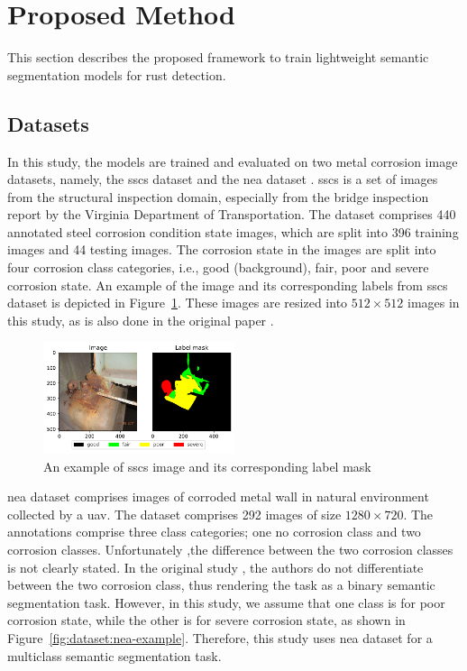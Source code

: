 \documentclass[mathematics,article,submit,pdftex,moreauthors]{Definitions/mdpi}
\begin{document}
\section{Proposed Method}
This section describes the proposed framework
to train lightweight semantic segmentation models
for rust detection. 

\subsection{Datasets}
In this study, the models are trained and evaluated on two metal corrosion image
datasets, namely, the \ac{sscs} dataset \cite{Bianchi2021Dataset,Bianchi2022Journal} and 
the \ac{nea} dataset \cite{Liu2023}. \ac{sscs} is a set of 
images from the structural inspection domain,
especially from the bridge inspection report 
by the Virginia Department of Transportation. 
The dataset comprises 440 annotated steel corrosion condition state images,
which are split into 396 training images and 44 testing images.
The corrosion state in the images are split into four corrosion
class categories, i.e., good (background), fair, poor and severe corrosion state.
An example of the image and its corresponding labels
from \ac{sscs} dataset is depicted in Figure~\ref{fig:dataset:ccsc-example}.
These images are resized into $512\times 512$ images in this study, as is also done
in the original paper \cite{Bianchi2022Journal}.

\begin{figure}[htbp]
    \begin{center}
    \includegraphics[width=0.5\textwidth]{figures/ccsc-example.pdf}
    \caption{An example of \ac{sscs} image and its corresponding label mask}
    \label{fig:dataset:ccsc-example}
    \end{center}
\end{figure}

\ac{nea} dataset comprises images of corroded metal wall
in natural environment collected by a \ac{uav}.
The dataset comprises 292 images of size $1280\times 720$.
The annotations comprise three class categories; one no corrosion class
and two corrosion classes. Unfortunately ,the difference
between the two corrosion classes is not clearly stated. 
In the original study \cite{Liu2023}, the authors
do not differentiate between the two corrosion class,
thus rendering the task as a binary semantic segmentation
task. However, in this study, 
we assume that one class is for poor corrosion state, 
while the other is for severe corrosion state, as shown
in Figure~\ref{fig:dataset:nea-example}. Therefore,
this study uses \ac{nea} dataset for a multiclass semantic
segmentation task.
\end{document}
